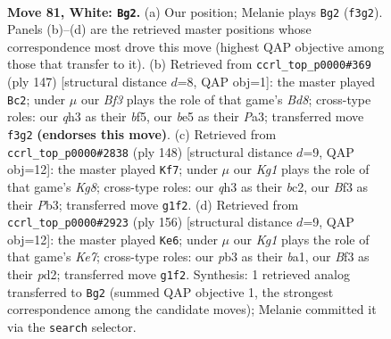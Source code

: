 \documentclass[11pt]{article}
\begin{document}
\clearpage

\begin{figure}[p]\centering
\begin{subfigure}{0.46\textwidth}\centering
\resizebox{\linewidth}{!}{%
\newchessgame
\chessboard[
  setfen={8/8/8/4b3/8/1p3B1q/3k4/6K1 w - - 4 81},
  showmover=false,
  pgfstyle=straightmove, color=movearrow, markmove={f3-g2}
]}
\caption{}
\end{subfigure}\hfill
\begin{subfigure}{0.46\textwidth}\centering
\resizebox{\linewidth}{!}{%
\newchessgame
\chessboard[
  setfen={8/8/7P/5B2/8/p5K1/8/1k1b4 b - - 1 74},
  showmover=false,
  pgfstyle=straightmove, color=movearrow, markmove={d1-c2}
]}
\caption{}
\end{subfigure}
\\[4pt]
\begin{subfigure}{0.46\textwidth}\centering
\resizebox{\linewidth}{!}{%
\newchessgame
\chessboard[
  setfen={3B2K1/8/3k4/8/1p6/1P6/2b5/8 w - - 5 75},
  showmover=false,
  pgfstyle=straightmove, color=movearrow, markmove={g8-f7}
]}
\caption{}
\end{subfigure}\hfill
\begin{subfigure}{0.46\textwidth}\centering
\resizebox{\linewidth}{!}{%
\newchessgame
\chessboard[
  setfen={8/4K3/6k1/8/8/4B3/3p4/b2B4 w - - 16 79},
  showmover=false,
  pgfstyle=straightmove, color=movearrow, markmove={e7-e6}
]}
\caption{}
\end{subfigure}
\caption{\textbf{Move 81, White: \texttt{Bg2}.} (a) Our position; Melanie plays \texttt{Bg2} (\texttt{f3g2}). Panels (b)--(d) are the retrieved master positions whose correspondence most drove this move (highest QAP objective among those that transfer to it). (b) Retrieved from \texttt{ccrl\_top\_p0000\#369} (ply 147) [structural distance $d$=8, QAP obj=1]: the master played \texttt{Bc2}; under $\mu$ our \emph{Bf3} plays the role of that game's \emph{Bd8}; cross-type roles: our \emph{q}h3 as their \emph{b}f5, our \emph{b}e5 as their \emph{P}a3; transferred move \texttt{f3g2} \textbf{(endorses this move)}. (c) Retrieved from \texttt{ccrl\_top\_p0000\#2838} (ply 148) [structural distance $d$=9, QAP obj=12]: the master played \texttt{Kf7}; under $\mu$ our \emph{Kg1} plays the role of that game's \emph{Kg8}; cross-type roles: our \emph{q}h3 as their \emph{b}c2, our \emph{B}f3 as their \emph{P}b3; transferred move \texttt{g1f2}. (d) Retrieved from \texttt{ccrl\_top\_p0000\#2923} (ply 156) [structural distance $d$=9, QAP obj=12]: the master played \texttt{Ke6}; under $\mu$ our \emph{Kg1} plays the role of that game's \emph{Ke7}; cross-type roles: our \emph{p}b3 as their \emph{b}a1, our \emph{B}f3 as their \emph{p}d2; transferred move \texttt{g1f2}. Synthesis: 1 retrieved analog transferred to \texttt{Bg2} (summed QAP objective 1, the strongest correspondence among the candidate moves); Melanie committed it via the \texttt{search} selector.}
\label{fig:thought-m160}
\end{figure}
\end{document}
